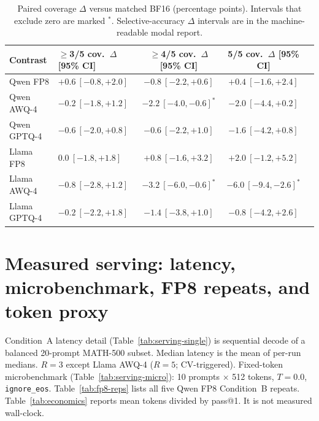 \documentclass[11pt,a4paper]{article}
\begin{document}
\begin{table}[t]
\centering
\caption{Paired coverage $\Delta$ versus matched BF16 (percentage points). Intervals that exclude zero are marked $^*$. Selective-accuracy $\Delta$ intervals are in the machine-readable modal report.}
\label{tab:modal-paired}
\small
\begin{tabular}{llccc}
\toprule
\textbf{Contrast} & $\ge$3/5 cov.\ $\Delta$ [95\% CI] & $\ge$4/5 cov.\ $\Delta$ [95\% CI] & 5/5 cov.\ $\Delta$ [95\% CI] \\
\midrule
Qwen FP8     & $+0.6\ [-0.8,+2.0]$ & $-0.8\ [-2.2,+0.6]$ & $+0.4\ [-1.6,+2.4]$ \\
Qwen AWQ-4   & $-0.2\ [-1.8,+1.2]$ & $-2.2\ [-4.0,-0.6]^*$ & $-2.0\ [-4.4,+0.2]$ \\
Qwen GPTQ-4  & $-0.6\ [-2.0,+0.8]$ & $-0.6\ [-2.2,+1.0]$ & $-1.6\ [-4.2,+0.8]$ \\
Llama FP8    & $0.0\ [-1.8,+1.8]$ & $+0.8\ [-1.6,+3.2]$ & $+2.0\ [-1.2,+5.2]$ \\
Llama AWQ-4  & $-0.8\ [-2.8,+1.2]$ & $-3.2\ [-6.0,-0.6]^*$ & $-6.0\ [-9.4,-2.6]^*$ \\
Llama GPTQ-4 & $-0.2\ [-2.2,+1.8]$ & $-1.4\ [-3.8,+1.0]$ & $-0.8\ [-4.2,+2.6]$ \\
\bottomrule
\end{tabular}
\end{table}

\section{Measured serving: latency, microbenchmark, FP8 repeats, and token proxy}
\label{app:serving}
Condition~A latency detail (Table~\ref{tab:serving-single}) is sequential decode of a balanced 20-prompt MATH-500 subset. Median latency is the mean of per-run medians. $R=3$ except Llama AWQ-4 ($R=5$; CV-triggered). Fixed-token microbenchmark (Table~\ref{tab:serving-micro}): 10 prompts $\times$ 512 tokens, $T=0.0$, \texttt{ignore\_eos}. Table~\ref{tab:fp8-reps} lists all five Qwen FP8 Condition~B repeats. Table~\ref{tab:economics} reports mean tokens divided by pass@1. It is not measured wall-clock.
\end{document}
